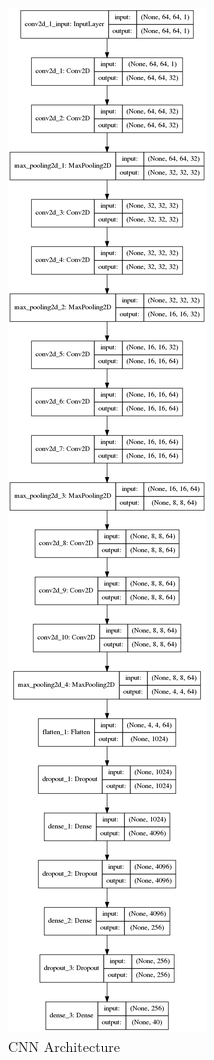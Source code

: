 \documentclass[10pt,conference]{IEEEtran}
\begin{document}
\begin{figure}[!tbhp]
	\centering
	\includegraphics[width = 0.55\linewidth]{model3.png}
	\caption{CNN Architecture}
	\label{fig:CNN}
\end{figure}
\end{document}
